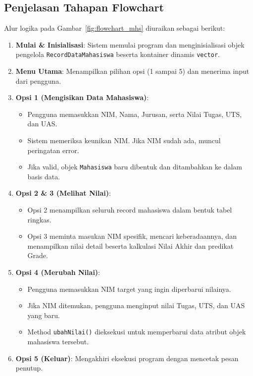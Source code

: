 \documentclass[12pt,a4paper]{article}
\begin{document}
\subsection{Penjelasan Tahapan Flowchart}
Alur logika pada Gambar~\ref{fig:flowchart_mhs} diuraikan sebagai berikut:
\begin{enumerate}
    \item \textbf{Mulai \& Inisialisasi}: Sistem memulai program dan menginisialisasi objek pengelola \texttt{RecordDataMahasiswa} beserta kontainer dinamis \texttt{vector}.
    \item \textbf{Menu Utama}: Menampilkan pilihan opsi (1 sampai 5) dan menerima input dari pengguna.
    \item \textbf{Opsi 1 (Mengisikan Data Mahasiswa)}:
    \begin{itemize}
        \item Pengguna memasukkan NIM, Nama, Jurusan, serta Nilai Tugas, UTS, dan UAS.
        \item Sistem memeriksa keunikan NIM. Jika NIM sudah ada, muncul peringatan error.
        \item Jika valid, objek \texttt{Mahasiswa} baru dibentuk dan ditambahkan ke dalam basis data.
    \end{itemize}
    \item \textbf{Opsi 2 \& 3 (Melihat Nilai)}:
    \begin{itemize}
        \item Opsi 2 menampilkan seluruh record mahasiswa dalam bentuk tabel ringkas.
        \item Opsi 3 meminta masukan NIM spesifik, mencari keberadaannya, dan menampilkan nilai detail beserta kalkulasi Nilai Akhir dan predikat Grade.
    \end{itemize}
    \item \textbf{Opsi 4 (Merubah Nilai)}:
    \begin{itemize}
        \item Pengguna memasukkan NIM target yang ingin diperbarui nilainya.
        \item Jika NIM ditemukan, pengguna menginput nilai Tugas, UTS, dan UAS yang baru.
        \item Method \texttt{ubahNilai()} dieksekusi untuk memperbarui data atribut objek mahasiswa tersebut.
    \end{itemize}
    \item \textbf{Opsi 5 (Keluar)}: Mengakhiri eksekusi program dengan mencetak pesan penutup.
\end{enumerate}
\end{document}
